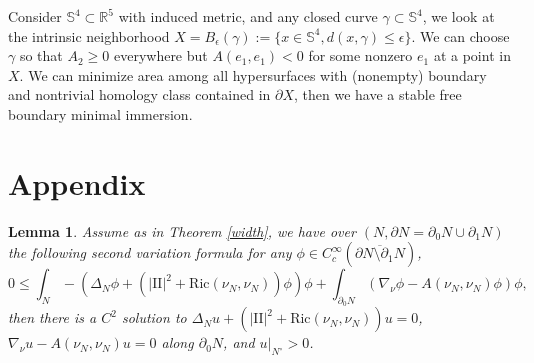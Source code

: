 \documentclass[12pt]{amsart}
\newcommand{\R}{\mathbb R}
\newcommand{\Sph}{\mathbb S}
\newcommand{\sff}{\mathrm{I\!I}}
\newcommand{\Ric}{\text{Ric}}
\newcommand{\p}{\partial}
\newtheorem{lemma}[theorem]{Lemma}
\numberwithin{equation}{section}
\begin{document}
	Consider $\Sph^4 \subset \R^5$ with induced metric, and any closed curve $\gamma \subset \Sph^4$, we look at the intrinsic neighborhood $X=B_{\epsilon}(\gamma):=\{x \in \Sph^4, d(x,\gamma)\leq \epsilon\}$. We can choose $\gamma$ so that $A_2 \geq 0$ everywhere but $A(e_1,e_1)<0$ for some nonzero $e_1$ at a point in $X$. We can minimize area among all hypersurfaces with (nonempty) boundary and nontrivial homology class contained in $\p X$, then we have a stable free boundary minimal immersion.


\section{Appendix}
\begin{lemma}\label{appen1}
		Assume as in Theorem \ref{width}, we have over $(N,\p N=\p_0 N\cup \p_1 N)$ the following second variation formula for any $\phi\in C^{\infty}_c(\overline{\p N \setminus \p_1 N})$,
		\begin{equation*}
			0\leq \int_N -(\Delta_N \phi+(|\sff|^2+\Ric(\nu_N,\nu_N))\phi)\phi+\int_{\p_0 N}(\nabla_{\nu}\phi-A(\nu_N,\nu_N)\phi)\phi,
		\end{equation*}
		then there is a $C^{2}$ solution to $\Delta_N u+(|\sff|^2+\Ric(\nu_N,\nu_N))u=0$, $\nabla_{\nu} u-A(\nu_N,\nu_N)u=0$ along $\partial_0 N$,  and $u\rvert_{N^{\circ}}>0$. 
\end{lemma}
\end{document}

